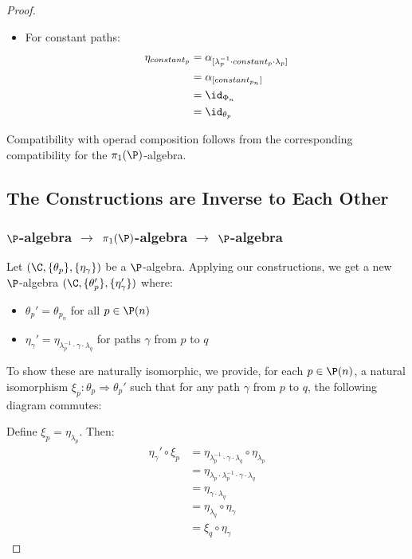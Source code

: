 \begin{proof}
\begin{itemize}
    \item For constant paths:
    \begin{align}
        \eta_{constant_p} &= \alpha_{[\lambda_p^{-1} \cdot constant_p \cdot \lambda_p]} \\
        &= \alpha_{[constant_{p_n}]} \\
        &= \id_{\Phi_n} \\
        &= \id_{\theta_p}
    \end{align}
\end{itemize}

Compatibility with operad composition follows from the corresponding compatibility for the $\pi_1(\P)$-algebra.

\subsection{The Constructions are Inverse to Each Other}

\subsubsection{$\P$-algebra $\to$ $\pi_1(\P)$-algebra $\to$ $\P$-algebra}

Let $(\C, \{\theta_p\}, \{\eta_\gamma\})$ be a $\P$-algebra. Applying our constructions, we get a new $\P$-algebra $(\C, \{\theta_p'\}, \{\eta_\gamma'\})$ where:

\begin{itemize}
    \item $\theta_p' = \theta_{p_n}$ for all $p \in \P(n)$
    \item $\eta_\gamma' = \eta_{\lambda_p^{-1} \cdot \gamma \cdot \lambda_q}$ for paths $\gamma$ from $p$ to $q$
\end{itemize}

To show these are naturally isomorphic, we provide, for each $p \in \P(n)$, a natural isomorphism $\xi_p: \theta_p \Rightarrow \theta_p'$ such that for any path $\gamma$ from $p$ to $q$, the following diagram commutes:

\begin{center}
\end{center}

Define $\xi_p = \eta_{\lambda_p}$. Then:
\begin{align}
    \eta_\gamma' \circ \xi_p &= \eta_{\lambda_p^{-1} \cdot \gamma \cdot \lambda_q} \circ \eta_{\lambda_p} \\
    &= \eta_{\lambda_p \cdot \lambda_p^{-1} \cdot \gamma \cdot \lambda_q} \\
    &= \eta_{\gamma \cdot \lambda_q} \\
    &= \eta_{\lambda_q} \circ \eta_\gamma \\
    &= \xi_q \circ \eta_\gamma
\end{align}


\end{proof}
